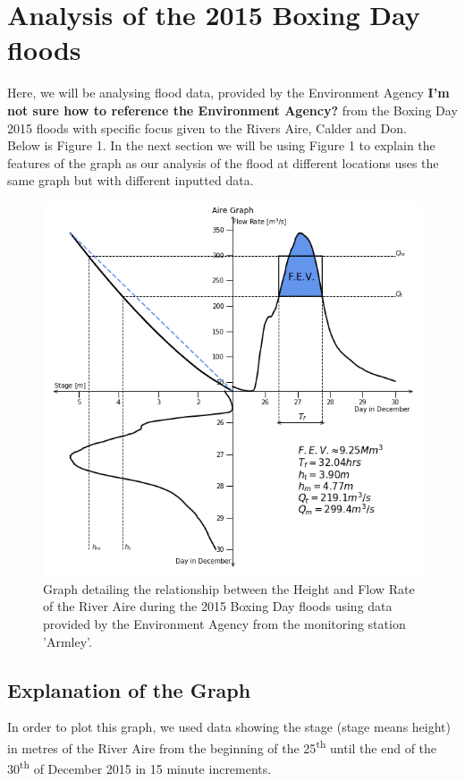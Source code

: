 \documentclass[11 pt, a4paper]{article}
\begin{document}
\section{Analysis of the 2015 Boxing Day floods}
Here, we will be analysing flood data, provided by the Environment Agency {\bf I'm not sure how to reference the Environment Agency?} from the Boxing Day 2015 floods with specific focus given to the Rivers Aire, Calder and Don.\\
Below is Figure 1. In the next section we will be using Figure 1 to explain the features of the graph as our analysis of the flood at different locations uses the same graph but with different inputted data.
\begin{figure}[H]
\begin{center}
\includegraphics[width=.5\linewidth]{Aire-Quadrant_Graph.png}
\caption{Graph detailing the relationship between the Height and Flow Rate of the River Aire during the 2015 Boxing Day floods using data provided by the Environment Agency from the monitoring station 'Armley'.}
\end{center}
\end{figure}

\subsection{Explanation of the Graph}
In order to plot this graph, we used data showing the stage (stage means height) in metres of the River Aire from the beginning of the 25\textsuperscript{th} until the end of the 30\textsuperscript{th} of December 2015 in 15 minute increments.\\ 
\end{document}
